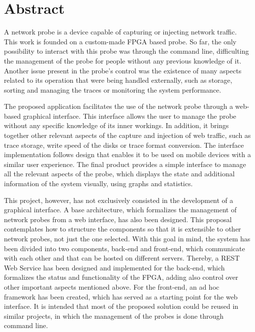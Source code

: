\chapter*{Abstract}

\begin{abstractEn}

A network probe is a device capable of capturing or injecting network traffic.
This work is founded on a custom-made FPGA based probe.
So far, the only possibility to interact with this probe was through the command line, difficulting the management of the probe for people without any previous knowledge of it.
Another issue present in the probe's control was the existence of many aspects related to its operation that were being handled externally, such as storage, sorting and managing the traces or monitoring the system performance.

The proposed application facilitates the use of the network probe through a web-based graphical interface.
This interface allows the user to manage the probe without any specific knowledge of its inner workings.
In addition, it brings together other relevant aspects of the capture and injection of web traffic, such as trace storage, write speed of the disks or trace format conversion.
The interface implementation follows design that enables it to be used on mobile devices with a similar user experience.
The final product provides a simple interface to manage all the relevant aspects of the probe, which displays the state and additional information of the system visually, using graphs and statistics.

This project, however, has not exclusively consisted in the development of a graphical interface.
A base architecture, which formalizes the management of network probes from a web interface, has also been designed.
This proposal contemplates how to structure the components so that it is extensible to other network probes, not just the one selected.
With this goal in mind, the system has been divided into two components, back-end and front-end, which communicate with each other and that can be hosted on different servers.
Thereby, a REST Web Service has been designed and implemented for the back-end, which formalizes the status and functionality of the FPGA, adding also control over other important aspects mentioned above.
For the front-end, an ad hoc framework has been created, which has served as a starting point for the web interface.
It is intended that most of the proposed solution could be reused in similar projects, in which the management of the probes is done through command line.

\end{abstractEn}


